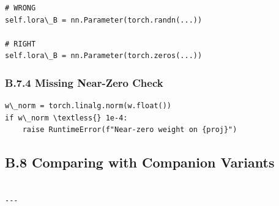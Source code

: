 \begin{lstlisting}
# WRONG
self.lora\_B = nn.Parameter(torch.randn(...))

# RIGHT
self.lora\_B = nn.Parameter(torch.zeros(...))
\end{lstlisting}

\subsubsection{B.7.4 Missing Near-Zero Check}

\begin{lstlisting}
w\_norm = torch.linalg.norm(w.float())
if w\_norm \textless{} 1e-4:
    raise RuntimeError(f"Near-zero weight on {proj}")
\end{lstlisting}

\subsection{B.8 Comparing with Companion Variants}

\begin{lstlisting}

---
\end{lstlisting}